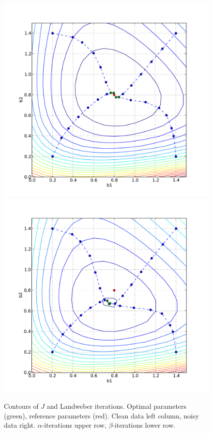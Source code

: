 \begin{figure}
\begin{center}
    \includegraphics[width=\smallfig]{chapters/schroll/pdf/b1b2scan4.pdf}
    \includegraphics[width=\smallfig]{chapters/schroll/pdf/b1b2scan4-5.pdf}
    \caption{Contours of $J$ and Landweber iterations. Optimal parameters
    (green), reference parameters (red).
      Clean data left column, noisy data right. $\alpha$-iterations
      upper row, $\beta$-iterations lower row.}
    \label{fig2}
  \end{center}
\end{figure}

